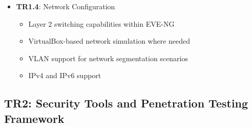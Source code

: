 \begin{itemize}
\item \textbf{TR1.4}: Network Configuration
\begin{itemize}
\item Layer 2 switching capabilities within EVE-NG
\item VirtualBox-based network simulation where needed
\item VLAN support for network segmentation scenarios
\item IPv4 and IPv6 support
\end{itemize}

\end{itemize}

\subsection{TR2: Security Tools and Penetration Testing Framework}

